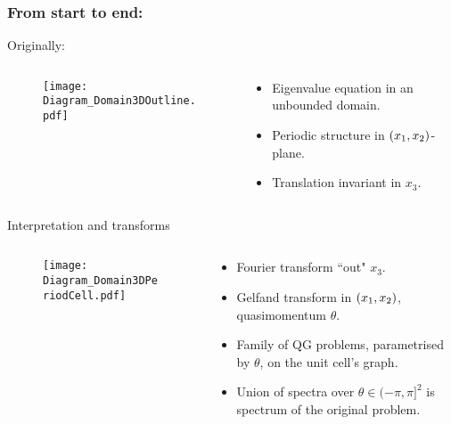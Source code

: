 \documentclass{beamer}
\begin{document}
\begin{frame}
	\frametitle{From start to end:}
	
	Originally:
	\begin{columns}
		\begin{column}{0.20\textwidth}
			\begin{figure}
				\centering
				\texttt{[image: Diagram\_Domain3DOutline.pdf]}
			\end{figure}			
		\end{column}
		\begin{column}{0.75\textwidth}
			\begin{itemize}
				\item Eigenvalue equation in an unbounded domain.
				\item Periodic structure in $\left( x_1,x_2 \right)$-plane.
				\item Translation invariant in $x_3$.
			\end{itemize}
		\end{column}
	\end{columns}
	
	\begin{block}{Interpretation and transforms}
		\begin{columns}
			\begin{column}{0.20\textwidth}
				\begin{figure}
					\centering
					\texttt{[image: Diagram\_Domain3DPeriodCell.pdf]}
				\end{figure}			
			\end{column}
			\begin{column}{0.75\textwidth}
				\begin{itemize}
					\item Fourier transform ``out" $x_3$.
					\item Gelfand transform in $\left( x_1,x_2 \right)$, quasimomentum $\theta$.
					\item Family of QG problems, parametrised by $\theta$, on the unit cell's graph.
					\item Union of spectra over $\theta\in(-\pi,\pi]^2$ is spectrum of the original problem.
				\end{itemize}
			\end{column}
		\end{columns}	
	\end{block}
\end{frame}
\end{document}
